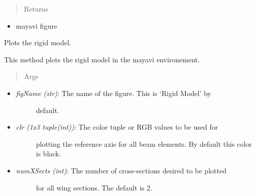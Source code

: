 \documentclass[letterpaper,10pt,english]{sphinxmanual}
\begin{document}
\begin{fulllineitems}
\begin{fulllineitems}
\begin{itemize}
\end{itemize}
\begin{quote}\begin{description}
\item[{Returns}] \leavevmode
\end{description}\end{quote}
\begin{itemize}
\item {} 
mayavi figure

\end{itemize}

\end{fulllineitems}


\begin{fulllineitems}
\label{FEM:AeroComBAT.FEM.Model.plotRigidModel}
Plots the rigid model.

This method plots the rigid model in the mayavi environement.
\begin{quote}\begin{description}
\item[{Args}] \leavevmode
\end{description}\end{quote}
\begin{itemize}
\item {} \begin{description}
\item[{\emph{figName (str)}: The name of the figure. This is `Rigid Model' by}] \leavevmode
default.

\end{description}

\item {} \begin{description}
\item[{\emph{clr (1x3 tuple(int))}: The color tuple or RGB values to be used for}] \leavevmode
plotting the reference axis for all beam elements. By default this
color is black.

\end{description}

\item {} \begin{description}
\item[{\emph{numXSects (int)}: The number of cross-sections desired to be plotted}] \leavevmode
for all wing sections. The default is 2.


\end{description}
\end{itemize}
\end{fulllineitems}
\end{fulllineitems}
\end{document}
